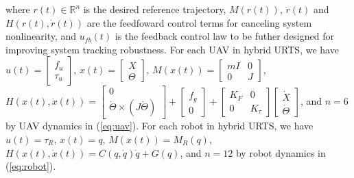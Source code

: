 \documentclass[journal,12pt,onecolumn,draftclsnofoot,]{IEEEtran}
\begin{document}
where $r(t)\in\mathbb{R}^n$ is the desired reference trajectory, $M(r(t))$, $\ddot{r}(t)$ and $H(r(t), \dot{r}(t))$ are the feedfoward control terms for canceling system nonlinearity, and $u_{fb}(t)$ is the feedback control law to be futher designed for improving system tracking robustness. For each UAV in hybrid URTS, we have $u(t)=\begin{bmatrix}
    f_u \\ \tau_u
\end{bmatrix}$, $x(t)=\begin{bmatrix}
    X \\ \Theta
\end{bmatrix}$, $M(x(t))=\begin{bmatrix}
    mI & 0 \\ 0 & J
\end{bmatrix}$, $H(x(t),\dot{x}(t))=\begin{bmatrix}
    0 \\ \dot{\Theta}\times(J\dot{\Theta})
\end{bmatrix}+\begin{bmatrix}
    f_g \\ 0
\end{bmatrix}+\begin{bmatrix}
    K_F & 0 \\
    0 & K_\tau
\end{bmatrix}\begin{bmatrix}
    \dot{X} \\ \dot{\Theta}
\end{bmatrix}$, and $n=6$ by UAV dynamics in (\ref{eq:uav}). For each robot in hybrid URTS, we have $u(t)=\tau_R$, $x(t)=q$, $M(x(t))=M_R(q)$, $H(x(t),\dot{x}(t))=C(q,\dot{q})\dot{q} + G(q)$, and $n=12$ by robot dynamics in (\ref{eq:robot}).
\end{document}

